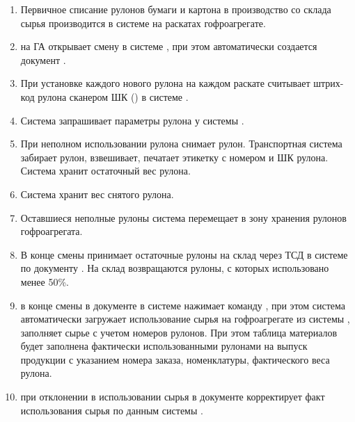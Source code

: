 \begin{enumerate}
\item Первичное списание рулонов бумаги и картона в производство со склада сырья производится в системе \syncro на раскатах гофроагрегате. 
\item \gaoperator на ГА открывает смену в системе \gofro, при этом автоматически создается документ  .
\item При установке каждого нового рулона \linkoperator 
на каждом раскате считывает штрих-код рулона сканером ШК () в системе \syncro.
\item Система \syncro запрашивает параметры рулона у системы \gofro.


\item При неполном использовании рулона  \linkoperator снимает рулон. Транспортная система \newkuani забирает рулон, взвешивает, печатает этикетку с номером и ШК рулона. Система \syncro хранит остаточный вес рулона.
\item Система \newkuani хранит вес снятого рулона.
\item Оставшиеся неполные рулоны система \newkuani перемещает в зону хранения рулонов гофроагрегата.
\item В конце смены \kladovshik принимает остаточные рулоны на склад через ТСД в системе \erp по документу .
На склад возвращаются рулоны, с которых использовано менее 50\%.
\item \gaoperator в конце смены в документе  в системе \gofro нажимает команду ,   при этом система \gofro автоматически загружает использование сырья на гофроагрегате из системы \syncro, заполняет сырье с учетом номеров рулонов. При этом таблица материалов будет заполнена фактически использованными рулонами на выпуск продукции с указанием номера заказа, номенклатуры, фактического веса рулона. 
\item \gaoperator при отклонении в использовании сырья в документе  корректирует факт использования сырья по данным системы \syncro.


\end{enumerate}



